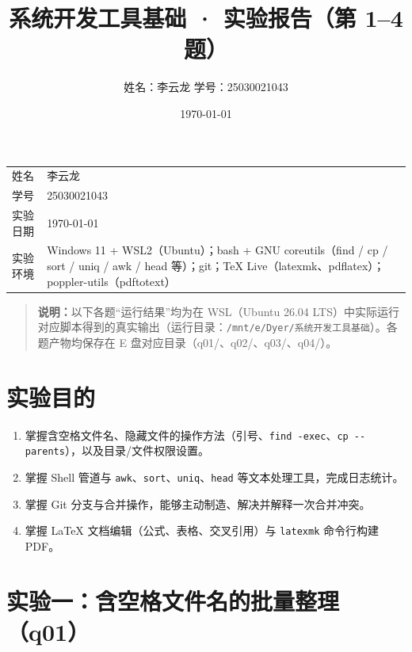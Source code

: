 \documentclass[UTF8,fontset=ubuntu]{ctexart}
\title{\textbf{系统开发工具基础 · 实验报告（第 1--4 题）}}
\author{姓名：李云龙 \quad 学号：25030021043}
\date{\today}
\begin{document}
\maketitle

\begin{center}
\begin{tabular}{@{}p{3cm}p{11.5cm}@{}}
\toprule
姓名 & 李云龙 \\
学号 & 25030021043 \\
实验日期 & \today \\
实验环境 & Windows 11 + WSL2（Ubuntu）；bash + GNU coreutils（find / cp / sort / uniq / awk / head 等）；git；TeX Live（latexmk、pdflatex）；poppler-utils（pdftotext） \\
\bottomrule
\end{tabular}
\end{center}

\begin{quote}
\textbf{说明：}以下各题“运行结果”均为在 WSL（Ubuntu 26.04 LTS）中实际运行对应脚本得到的真实输出（运行目录：\lstinline|/mnt/e/Dyer/系统开发工具基础|）。各题产物均保存在 E 盘对应目录（q01/、q02/、q03/、q04/）。
\end{quote}

\section{实验目的}
\begin{enumerate}
\item 掌握含空格文件名、隐藏文件的操作方法（引号、\lstinline|find -exec|、\lstinline|cp --parents|），以及目录/文件权限设置。
\item 掌握 Shell 管道与 \lstinline|awk|、\lstinline|sort|、\lstinline|uniq|、\lstinline|head| 等文本处理工具，完成日志统计。
\item 掌握 Git 分支与合并操作，能够主动制造、解决并解释一次合并冲突。
\item 掌握 LaTeX 文档编辑（公式、表格、交叉引用）与 \lstinline|latexmk| 命令行构建 PDF。
\end{enumerate}

\section{实验一：含空格文件名的批量整理（q01）}
\end{document}
